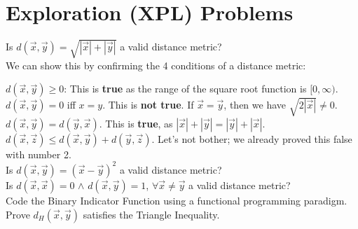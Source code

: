 \section{Exploration (XPL) Problems}

\begin{outline}[enumerate]
    \1 Is $d(\vec{x},\vec{y}) = \sqrt{|\vec{x}| + |\vec{y}|}$ a valid distance metric? \\

    We can show this by confirming the 4 conditions of a distance metric:
    
        \2 $d(\vec{x},\vec{y}) \ge 0$: This is \textbf{true} as the range of the square root function is $[0,\infty)$.
        \2 $d(\vec{x},\vec{y}) = 0$ iff $x=y$. This is \textbf{not true}. If $\vec{x}=\vec{y}$, then we have $\sqrt{2|\vec{x}|} \neq 0$.
        \2 $d(\vec{x},\vec{y}) = d(\vec{y},\vec{x})$. This is \textbf{true}, as $|\vec{x}| + |\vec{y}| = |\vec{y}| + |\vec{x}|$.
        \2 $d(\vec{x},\vec{z}) \leq d(\vec{x},\vec{y}) + d(\vec{y},\vec{z})$. Let's not bother; we already proved this false with number 2. \\

    \1 Is $d(\vec{x},\vec{y}) = (\vec{x} - \vec{y})^2$ a valid distance metric? \\

    \1 Is $d(\vec{x},\vec{x}) = 0$ $\wedge$ $d(\vec{x},\vec{y}) = 1$, $\forall \vec{x} \neq \vec{y}$ a valid distance metric? \\

    \1 Code the Binary Indicator Function using a functional programming paradigm. \\

    \1 Prove $d_H(\vec{x},\vec{y})$ satisfies the Triangle Inequality.
\end{outline}

